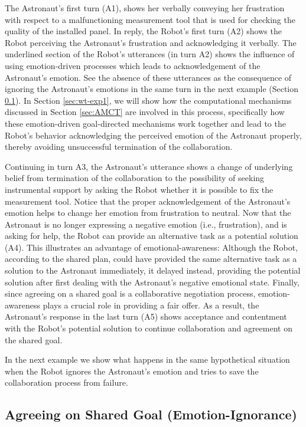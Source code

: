 The Astronaut's first turn (A1), shows her verbally conveying her frustration
with respect to a malfunctioning measurement tool that is used for checking the
quality of the installed panel. In reply, the Robot's first turn (A2) shows the
Robot perceiving the Astronaut's frustration and acknowledging it verbally. The
underlined section of the Robot's utterances (in turn A2) shows the influence of
using emotion-driven processes which leads to acknowledgement of the Astronaut's
emotion. See the absence of these utterances as the consequence of ignoring the
Astronaut's emotions in the same turn in the next example (Section
\ref{sec:exp2}). In Section \ref{sec:wt-exp1}, we will show how the
computational mechanisms discussed in Section \ref{sec:AMCT} are involved in
this process, specifically how these emotion-driven goal-directed mechanisms
work together and lead to the Robot's behavior acknowledging the perceived
emotion of the Astronaut properly, thereby avoiding unsuccessful termination of
the collaboration.

Continuing in turn A3, the Astronaut's utterance shows a change of underlying
belief from termination of the collaboration to the possibility of seeking
instrumental support by asking the Robot whether it is possible to fix the
measurement tool. Notice that the proper acknowledgement of the Astronaut's
emotion helps to change her emotion from frustration to neutral. Now that the
Astronaut is no longer expressing a negative emotion (i.e., frustration), and
is asking for help, the Robot can provide an alternative task as a potential
solution (A4). This illustrates an advantage of emotional-awareness: Although
the Robot, according to the shared plan, could have provided the same
alternative task as a solution to the Astronaut immediately, it delayed instead,
providing the potential solution after first dealing with the Astronaut's
negative emotional state. Finally, since agreeing on a shared goal is a
collaborative negotiation process, emotion-awareness plays a crucial role in
providing a fair offer. As a result, the Astronaut's response in the last turn
(A5) shows acceptance and contentment with the Robot's potential solution to
continue collaboration and agreement on the shared goal.

In the next example we show what happens in the same hypothetical situation when
the Robot ignores the Astronaut's emotion and tries to save the collaboration
process from failure.

\subsection{Agreeing on Shared Goal (Emotion-Ignorance)}
\label{sec:exp2}

